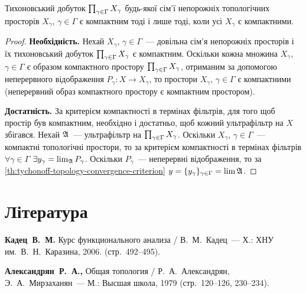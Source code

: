 \begin{theorem}
    Тихоновський добуток $\CartesianProduct{X}$ будь-якої сім'ї непорожніх топологічних просторів $X_\gamma$, $\gamma \in \Gamma$ є компактним тоді і лише тоді, коли усі $X_\gamma$ є компактними.
\end{theorem}

\begin{proof}
    \textbf{Необхідність.} Нехай $X_\gamma$, $\gamma \in \Gamma$~--- довільна сім'я непорожніх просторів і їх тихоновський добуток $\CartesianProduct{X}$ є компактним. Оскільки кожна множина $X_\gamma$, $\gamma \in \Gamma$ є образом компактного простору $\CartesianProduct{X}$, отриманим за допомогою неперервного відображення $P_\gamma: X \to X_\gamma$, то простори $X_\gamma$, $\gamma \in \Gamma$ є компактними (неперервний образ компактного простору є компактним простором).

    \textbf{Достатність.} За критерієм компактності в термінах фільтрів, для того щоб простір був компактним, необхідно і достатньо, щоб кожний ультрафільтр на $X$ збігався. Нехай $\frak A$~--- ультрафільтр на $\CartesianProduct{X}$. Оскільки $X_\gamma$, $\gamma \in \Gamma$~--- компактні топологічні простори, то за критерієм компактності в термінах фільтрів $\forall \gamma \in \Gamma$ $\exists y_\gamma = \lim_{\frak A} P_\gamma$. Оскільки $P_\gamma$~--- неперервні відображення, то за \cref{th:tychonoff-topology-convergence-criterion} $y = \{y_\gamma\}_{\gamma \in \Gamma} = \lim \frak A$.
\end{proof}

\section{Література}

\begin{enumerate}[label={[\arabic*]}]
\item \textbf{Кадец~В.~М.}
Курс функционального анализа /
В.~М.~Кадец~---
Х.: ХНУ им.~В.~Н.~Каразина, 2006. (стр.~492--495).
\item \textbf{Александрян~Р.~А., }
Общая топология /
Р.~А.~Александрян, Э.~А.~Мирзаханян~---
М.: Высшая школа, 1979 (стр.~120--126, 230--234).
\end{enumerate}
